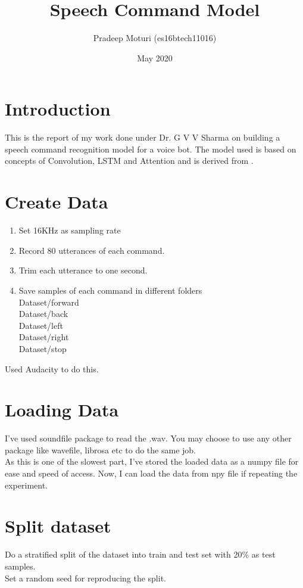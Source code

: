 \documentclass[11pt,english]{article}
\begin{document}
\title{Speech Command Model}
\author{Pradeep Moturi (es16btech11016)}
\date{May 2020}

\sloppy
\maketitle
\setlength{\columnsep}{0.25in}
\twocolumn
\tableofcontents

\section{Introduction}
This is the report of my work done under Dr. G V V Sharma on building a speech command recognition model for a voice bot. 
The model used is based on concepts of Convolution, LSTM and Attention and is derived from \cite{Paper}.

\section{Create Data}
\begin{enumerate}
    \item Set 16KHz as sampling rate
    \item Record 80 utterances of each command.
    \item Trim each utterance to one second.
    \item Save samples of each command in different folders\\
        Dataset/forward\\
        Dataset/back\\
        Dataset/left\\
        Dataset/right\\
        Dataset/stop
\end{enumerate}
Used Audacity to do this.

\section{Loading Data}
I've used soundfile package to read the .wav. You may choose to use any other package like wavefile, librosa etc to do the same job.\\
As this is one of the slowest part, I've stored the loaded data as a numpy file for ease and speed of access. Now, I can load the data from npy file if repeating the experiment.

\section{Split dataset}
Do a stratified split of the dataset into train and test set with 20\% as test samples.\\
Set a random seed for reproducing the split.
\end{document}
